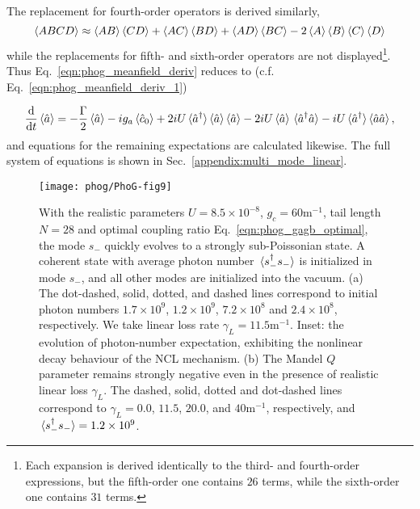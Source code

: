 The replacement for fourth-order operators is derived similarly,
\begin{equation}
\ev{A B C D} \approx \ev{A B}\ev{C D} + \ev{A C}\ev{B D} + \ev{A D}\ev{B C} - 2 \ev{A}\ev{B}\ev{C}\ev{D}
\end{equation}
while the replacements for fifth- and sixth-order operators are not displayed\footnote{Each expansion is derived identically to the third- and fourth-order expressions, but the fifth-order one contains $26$ terms, while the sixth-order one contains $31$ terms.}. Thus Eq.~\ref{eqn:phog_meanfield_deriv} reduces to (c.f. Eq.~\ref{eqn:phog_meanfield_deriv_1})

\begin{equation}
\ddt \ev{\hat{a}} = - \frac{\Gamma}{2} \ev{\hat{a}} - i g_a \ev{\hat{c}_0} + 2 i U \ev*{\hat{a}^\dagger}\ev{\hat{a}}\ev{\hat{a}} - 2 i U \ev{\hat{a}}\ev*{\hat{a}^\dagger \hat{a}} - i U \ev*{\hat{a}^\dagger} \ev{\hat{a} \hat{a}},
\end{equation}
and equations for the remaining expectations are calculated likewise. The full system of equations is shown in Sec.~\ref{appendix:multi_mode_linear}.




\begin{figure}[htp]
\centering
\texttt{[image: phog/PhoG-fig9]}
\caption{\label{fig:phog_multimode_linearized} With the realistic parameters $U = 8.5 \times 10^{-8}$, $g_c = 60$m$^{-1}$, tail length $N = 28$ and optimal coupling ratio Eq.~\ref{eqn:phog_gagb_optimal}, the mode $s_-$ quickly evolves to a strongly sub-Poissonian state. A coherent state with average photon number $\ev*{s_-^\dagger s_-}$ is initialized in mode $s_-$, and all other modes are initialized into the vacuum. (a) The dot-dashed, solid, dotted, and dashed lines correspond to initial photon numbers $1.7\times 10^9$, $1.2\times 10^9$, $7.2\times 10^8$ and $2.4\times 10^8$, respectively. We take linear loss rate $\gamma_L = 11.5$m$^{-1}$. Inset: the evolution of photon-number expectation, exhibiting the nonlinear decay behaviour of the NCL mechanism. (b) The Mandel $Q$ parameter remains strongly negative even in the presence of realistic linear loss $\gamma_L$. The dashed, solid, dotted and dot-dashed lines correspond to $\gamma_L = 0.0$, $11.5$, $20.0$, and $40$m$^{-1}$, respectively, and $\ev*{s_-^\dagger s_-} = 1.2\times 10^9$.}
\end{figure}


